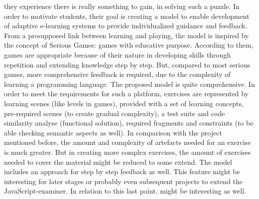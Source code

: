 \documentclass{article}
\begin{document}
they experience there is really something to gain, in solving such a puzzle.
In order to motivate students, their goal is creating a model to enable 
development of adaptive e-learning systems to provide individualized guidance 
and feedback. From a presupposed link between learning and playing, the model
is inspired by the concept of Serious Games: games with educative purpose. 
According to them, games are appropriate because of their nature in developing
skills through repetition and extending knowledge step by step. But, 
compared to most serious games, more comprehensive feedback is 
required, due to the complexity of learning a programming language. The proposed
model is quite comprehensive.
In order to meet the requirements for such a platform, exercises are 
represented by learning scenes (like levels in
games), provided with a set of learning concepts, pre-required scenes (to
create
gradual complexity), a test suite and code similarity analyse (functional 
solution),
required fragments and constraints (to be able checking
semantic aspects as well). In comparison with the 
project mentioned before, the amount and complexity of artefacts needed
for an exercise is
much greater. But in creating more complex exercises, the amount of exercises 
needed to cover the material might be reduced to some extend. The model includes 
an approach for step by step feedback as well. This feature might be interesting 
for later stages or probably even subsequent projects to extend the 
JavaScript-examiner. In relation to this last point, 
\citep{burckhardt2013s}
might be interesting as well.
\end{document}
